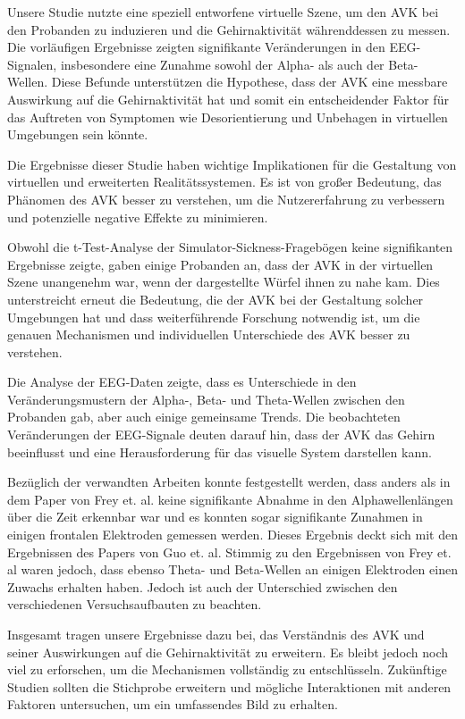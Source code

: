 \documentclass[conference]{IEEEtran}
\begin{document}
Unsere Studie nutzte eine speziell entworfene virtuelle Szene, um den AVK bei den Probanden zu induzieren und die Gehirnaktivität währenddessen zu messen. Die vorläufigen Ergebnisse zeigten signifikante Veränderungen in den EEG-Signalen, insbesondere eine Zunahme sowohl der Alpha- als auch der Beta-Wellen. Diese Befunde unterstützen die Hypothese, dass der AVK eine messbare Auswirkung auf die Gehirnaktivität hat und somit ein entscheidender Faktor für das Auftreten von Symptomen wie Desorientierung und Unbehagen in virtuellen Umgebungen sein könnte.

Die Ergebnisse dieser Studie haben wichtige Implikationen für die Gestaltung von virtuellen und erweiterten Realitätssystemen. Es ist von großer Bedeutung, das Phänomen des AVK besser zu verstehen, um die Nutzererfahrung zu verbessern und potenzielle negative Effekte zu minimieren.

Obwohl die t-Test-Analyse der Simulator-Sickness-Fragebögen keine signifikanten Ergebnisse zeigte, gaben einige Probanden an, dass der AVK in der virtuellen Szene unangenehm war, wenn der dargestellte Würfel ihnen zu nahe kam. Dies unterstreicht erneut die Bedeutung, die der AVK bei der Gestaltung solcher Umgebungen hat und dass weiterführende Forschung notwendig ist, um die genauen Mechanismen und individuellen Unterschiede des AVK besser zu verstehen.

Die Analyse der EEG-Daten zeigte, dass es Unterschiede in den Veränderungsmustern der Alpha-, Beta- und Theta-Wellen zwischen den Probanden gab, aber auch einige gemeinsame Trends. Die beobachteten Veränderungen der EEG-Signale deuten darauf hin, dass der AVK das Gehirn beeinflusst und eine Herausforderung für das visuelle System darstellen kann.

Bezüglich der verwandten Arbeiten konnte festgestellt werden, dass anders als in dem Paper von Frey et. al. keine signifikante Abnahme in den Alphawellenlängen über die Zeit erkennbar war und es konnten sogar signifikante Zunahmen in einigen frontalen Elektroden gemessen werden. Dieses Ergebnis deckt sich mit den Ergebnissen des Papers von Guo et. al. Stimmig zu den Ergebnissen von Frey et. al waren jedoch, dass ebenso Theta- und Beta-Wellen an einigen Elektroden einen Zuwachs erhalten haben. Jedoch ist auch der Unterschied zwischen den verschiedenen Versuchsaufbauten zu beachten.

Insgesamt tragen unsere Ergebnisse dazu bei, das Verständnis des AVK und seiner Auswirkungen auf die Gehirnaktivität zu erweitern. Es bleibt jedoch noch viel zu erforschen, um die Mechanismen vollständig zu entschlüsseln. Zukünftige Studien sollten die Stichprobe erweitern und mögliche Interaktionen mit anderen Faktoren untersuchen, um ein umfassendes Bild zu erhalten.
\end{document}
